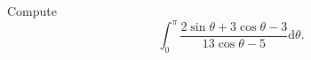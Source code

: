 Compute \[\displaystyle\int_{0}^{\pi}\frac{2\sin\theta+3\cos\theta-3}{13\cos\theta-5}\mathrm{d}\theta.\]